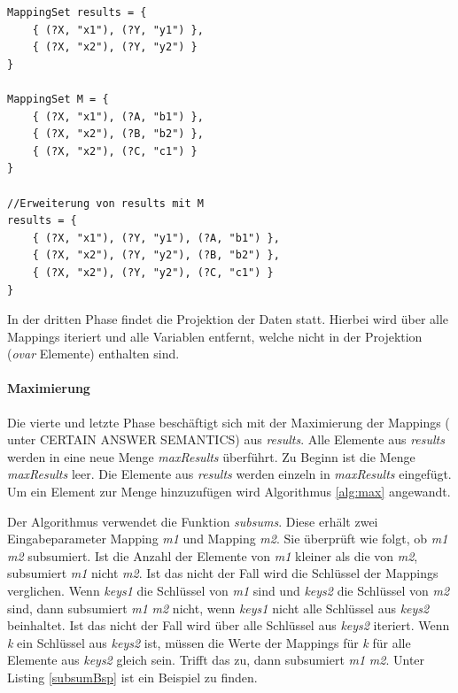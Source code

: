 \documentclass[draft,final]{vutinfth} %
\begin{document}
\begin{lstlisting}[float,caption={Beispiele für Erweiterung der MappingSets},frame=single,label={bspKompMap}]
MappingSet results = { 
	{ (?X, "x1"), (?Y, "y1") }, 
	{ (?X, "x2"), (?Y, "y2") } 
}

MappingSet M = { 
	{ (?X, "x1"), (?A, "b1") }, 
	{ (?X, "x2"), (?B, "b2") },
	{ (?X, "x2"), (?C, "c1") }
}

//Erweiterung von results mit M
results = { 
	{ (?X, "x1"), (?Y, "y1"), (?A, "b1") }, 
	{ (?X, "x2"), (?Y, "y2"), (?B, "b2") },
	{ (?X, "x2"), (?Y, "y2"), (?C, "c1") }
}
\end{lstlisting}

In der dritten Phase findet die Projektion der Daten statt. Hierbei wird über alle Mappings iteriert und alle Variablen entfernt, welche nicht in der Projektion (\textit{ovar} Elemente) enthalten sind. 

\paragraph{Maximierung} \label{maxMapPar}
Die vierte und letzte Phase beschäftigt sich mit der Maximierung der Mappings (\cite[S.~4]{CertainAnswers} unter CERTAIN ANSWER SEMANTICS) aus \textit{results}. Alle Elemente aus \textit{results} werden in eine neue Menge \textit{maxResults} überführt. Zu Beginn ist die Menge \textit{maxResults} leer. Die Elemente aus \textit{results} werden einzeln in \textit{maxResults} eingefügt. Um ein Element zur Menge hinzuzufügen wird Algorithmus \ref{alg:max} angewandt.

Der Algorithmus verwendet die Funktion \textit{subsums}. Diese erhält zwei Eingabeparameter Mapping \textit{m1} und Mapping \textit{m2}. Sie überprüft wie folgt, ob \textit{m1} \textit{m2} subsumiert. Ist die Anzahl der Elemente von \textit{m1} kleiner als die von \textit{m2}, subsumiert \textit{m1} nicht \textit{m2}. Ist das nicht der Fall wird die Schlüssel der Mappings verglichen. Wenn \textit{keys1} die Schlüssel von \textit{m1} sind und \textit{keys2} die Schlüssel von \textit{m2} sind, dann subsumiert \textit{m1} \textit{m2} nicht, wenn \textit{keys1} nicht alle Schlüssel aus \textit{keys2} beinhaltet. Ist das nicht der Fall wird über alle Schlüssel aus \textit{keys2} iteriert. Wenn \textit{k} ein Schlüssel aus \textit{keys2} ist, müssen die Werte der Mappings für \textit{k} für alle Elemente aus \textit{keys2} gleich sein. Trifft das zu, dann subsumiert \textit{m1} \textit{m2}. Unter Listing \ref{subsumBsp} ist ein Beispiel zu finden. 
\end{document}
